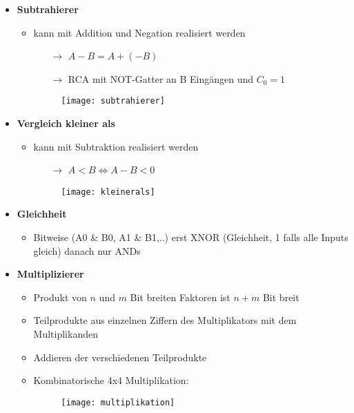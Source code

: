 \begin{itemize}
\item \textbf{Subtrahierer}
	\begin{itemize}
	\item kann mit Addition und Negation realisiert werden
		\begin{itemize}
		\item[$\rightarrow$] $A-B = A+ (-B)$
		\item[$\rightarrow$] RCA mit NOT-Gatter an B Eingängen und $C_0 = 1$
		\end{itemize}
	\item[]
		\begin{figure}[H]
		\begin{center}
		\texttt{[image: subtrahierer]}
		\end{center}
		\end{figure}
	\end{itemize}
	
\item \textbf{Vergleich kleiner als}
	\begin{itemize}
	\item kann mit Subtraktion realisiert werden
		\begin{itemize}
		\item[$\rightarrow$] $A < B \Leftrightarrow A-B <0$
		\end{itemize}
	\item[]
		\begin{figure}[H]
		\begin{center}
		\texttt{[image: kleinerals]}
		\end{center}
		\end{figure}
	\end{itemize}

\item \textbf{Gleichheit}
	\begin{itemize}
	\item Bitweise (A0 \& B0, A1 \& B1,..) erst XNOR (Gleichheit, 1 falls alle Inputs gleich) danach nur ANDs
	\end{itemize}

\item \textbf{Multiplizierer}
	\begin{itemize}
	\item Produkt von $n$ und $m$ Bit breiten Faktoren ist $n+m$ Bit breit
	\item Teilprodukte aus einzelnen Ziffern des Multiplikators mit dem Multiplikanden
	\item Addieren der verschiedenen Teilprodukte
	\item Kombinatorische 4x4 Multiplikation:
	\item[]
		\begin{figure}[H]
		\begin{center}
		\texttt{[image: multiplikation]}
		\end{center}
		\end{figure}
	\end{itemize}
\end{itemize}


